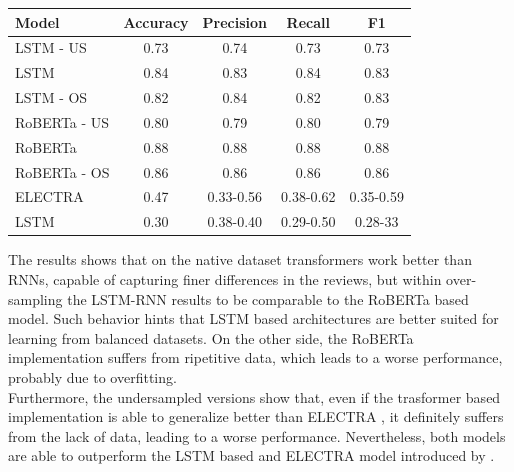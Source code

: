             \begin{table}[H]
                \centering
                \begin{tabular}{l c c c c}
                    \toprule
                    \textbf{Model} & \textbf{Accuracy} & \textbf{Precision} & \textbf{Recall} & \textbf{F1} \\                  
                    \midrule 
                    LSTM - US & 0.73 & 0.74 & 0.73 & 0.73 \\
                    LSTM & 0.84 & 0.83 & 0.84 & 0.83\\
                    LSTM - OS & 0.82 & 0.84 & 0.82 & 0.83 \\
                    RoBERTa - US & 0.80 & 0.79 & 0.80 & 0.79 \\
                    RoBERTa & 0.88 & 0.88 & 0.88 & 0.88 \\
                    RoBERTa - OS & 0.86 & 0.86 & 0.86 & 0.86 \\
                    ELECTRA \cite{husein2023sentiment} & 0.47 & 0.33-0.56 & 0.38-0.62 & 0.35-0.59 \\
                    LSTM \cite{husein2023sentiment} & 0.30 & 0.38-0.40 & 0.29-0.50 & 0.28-33 \\
                    \bottomrule
                \end{tabular}
                \label{tab:comparison_literature}
            \end{table}

            The results shows that on the native dataset transformers work better than RNNs,
            capable of capturing finer differences in the reviews, but within over-sampling
            the LSTM-RNN results to be comparable to the RoBERTa based model. Such behavior
            hints that LSTM based architectures are better suited for learning from 
            balanced datasets. On the other side, the RoBERTa implementation suffers from
            ripetitive data, which leads to a worse performance, probably due to 
            overfitting.\\

            Furthermore, the undersampled versions show that, even if the trasformer based
            implementation is able to generalize better than ELECTRA \citep{husein2023sentiment},
            it definitely suffers from the lack of data, leading to a worse performance. Nevertheless,
            both models are able to outperform the LSTM based and ELECTRA model introduced 
            by \citet{husein2023sentiment}.